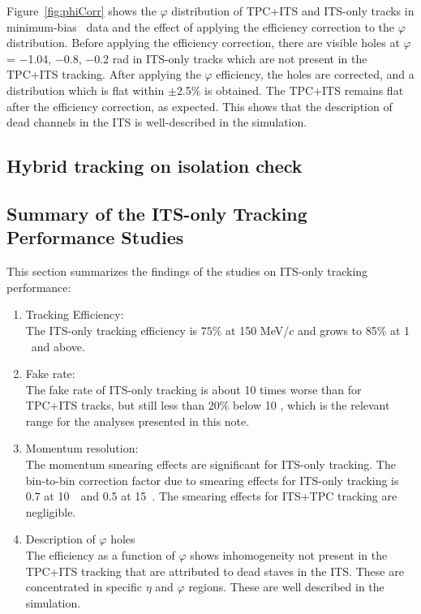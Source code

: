 Figure~\ref{fig:phiCorr} shows the $\varphi$ distribution of TPC+ITS and ITS-only tracks in minimum-bias \pPb~data and the effect of applying the efficiency correction to the $\varphi$ distribution. Before applying the efficiency correction, there are visible holes at $\varphi$ = $-$1.04, $-$0.8, $-$0.2 rad in ITS-only tracks which are not present in the TPC+ITS tracking. After applying the $\varphi$ efficiency, the holes are corrected, and a distribution which is flat within {$\pm$2.5\%} is obtained. The TPC+ITS remains flat after the efficiency correction, as expected. This shows that the description of dead channels in the ITS is well-described in the simulation. 


\subsection{Hybrid tracking on isolation check}

\subsection{Summary of the ITS-only Tracking Performance Studies} 
This section summarizes the findings of the studies on ITS-only tracking performance: 
\begin{enumerate}
\item Tracking Efficiency: \\
The ITS-only tracking efficiency is $75\%$ at 150 MeV/$c$ and grows to 85$\%$ at 1 \GeVc~and above. 
\item Fake rate:\\
The fake rate of ITS-only tracking is about 10 times worse than for TPC+ITS tracks, but still less than 20$\%$ below 10 \GeVc, which is the relevant range for the analyses presented in this note.
\item Momentum resolution:\\
The momentum smearing effects are significant for ITS-only tracking. The bin-to-bin correction factor due to smearing effects for ITS-only tracking is 0.7 at 10~\GeVc~and 0.5 at 15~\GeVc. The smearing effects for ITS+TPC tracking are negligible.
\item Description of $\varphi$ holes\\
The efficiency as a function of $\varphi$ shows inhomogeneity not present in the TPC+ITS tracking that are attributed to dead staves in the ITS. These are concentrated in specific $\eta$ and $\varphi$ regions. These are well described in the simulation. 
\end{enumerate}


